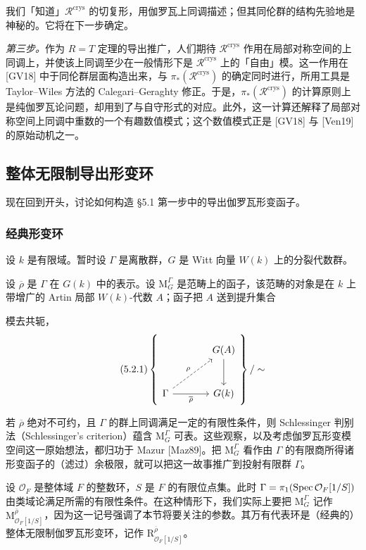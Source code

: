 我们「知道」$\mathcal R^{\mathrm{crys}}$ 的切复形，用伽罗瓦上同调描述；但其同伦群的结构先验地是神秘的。它将在下一步确定。

\emph{第三步。}作为 $R=T$ 定理的导出推广，人们期待 $\mathcal R^{\mathrm{crys}}$ 作用在局部对称空间的上同调上，并使该上同调至少在一般情形下是 $\mathcal R^{\mathrm{crys}}$ 上的「自由」模。这一作用在 [GV18] 中于同伦群层面构造出来，与 $\pi_*(\mathcal R^{\mathrm{crys}})$ 的确定同时进行，所用工具是 Taylor--Wiles 方法的 Calegari--Geraghty 修正。于是，$\pi_*(\mathcal R^{\mathrm{crys}})$ 的计算原则上是纯伽罗瓦论问题，却用到了与自守形式的对应。此外，这一计算还解释了局部对称空间上同调中重数的一个有趣数值模式；这个数值模式正是 [GV18] 与 [Ven19] 的原始动机之一。

\subsection{整体无限制导出形变环}

现在回到开头，讨论如何构造 §5.1 第一步中的导出伽罗瓦形变函子。

\subsubsection{经典形变环}

设 $k$ 是有限域。暂时设 $\Gamma$ 是离散群，$G$ 是 Witt 向量 $W(k)$ 上的分裂代数群。

设 $\overline\rho$ 是 $\Gamma$ 在 $G(k)$ 中的表示。设 $\mathrm M^\Gamma_G$ 是范畴上的函子，该范畴的对象是在 $k$ 上带增广的 Artin 局部 $W(k)$-代数 $A$；函子把 $A$ 送到提升集合

模去共轭，
\begin{equation}\tag{5.2.1}\label{eq:a6-03-3}
\left\{
\begin{tikzcd}[column sep=large, row sep=large]
& G(A)\arrow[d]\\
\Gamma\arrow[r,"\overline\rho"']\arrow[ur,"\rho",dashed] & G(k)
\end{tikzcd}
\right\}/\sim
\end{equation}

若 $\overline\rho$ 绝对不可约，且 $\Gamma$ 的群上同调满足一定的有限性条件，则 Schlessinger 判别法（Schlessinger's criterion）蕴含 $\mathrm M^\Gamma_G$ 可表。这些观察，以及考虑伽罗瓦形变模空间这一原始想法，都归功于 Mazur [Maz89]。把 $\mathrm M^\Gamma_G$ 看作由 $\Gamma$ 的有限商所得诸形变函子的（滤过）余极限，就可以把这一故事推广到投射有限群 $\Gamma$。

设 $\mathcal O_F$ 是整体域 $F$ 的整数环，$S$ 是 $F$ 的有限位点集。此时 $\Gamma=\pi_1(\operatorname{Spec}\mathcal O_F[1/S])$ 由类域论满足所需的有限性条件。在这种情形下，我们实际上要把 $\mathrm M^\Gamma_G$ 记作 $\mathrm M^{\overline\rho}_{\mathcal O_F[1/S]}$，因为这一记号强调了本节将要关注的参数。其万有代表环是（经典的）整体无限制伽罗瓦形变环，记作 $\mathrm R^{\overline\rho}_{\mathcal O_F[1/S]}$。

